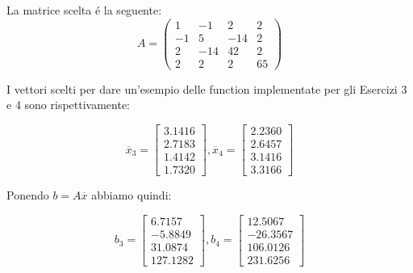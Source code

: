 \begin{center}
\footnotesize\noindent{}\end{center}

\noindent La matrice scelta \'e la seguente:
\[
A = \begin{pmatrix} 1 & -1 & 2 & 2 \\ -1 & 5 & -14 & 2\\ 2 & -14 & 42 & 2\\ 2 & 2 & 2 & 65 \end{pmatrix}
\]

\noindent I vettori scelti per dare un'esempio delle function implementate per gli Esercizi 3 e 4 sono rispettivamente:

\[
\overline{x}_3 = \begin{bmatrix} 3.1416 \\ 2.7183 \\ 1.4142 \\ 1.7320 \end{bmatrix},
\overline{x}_4 = \begin{bmatrix} 2.2360 \\ 2.6457 \\ 3.1416 \\ 3.3166 \end{bmatrix}
\]

\noindent Ponendo \(b=A\overline{x}\) abbiamo quindi:

\[
b_3 = \begin{bmatrix} 6.7157 \\ -5.8849 \\ 31.0874 \\ 127.1282 \end{bmatrix},
b_4 = \begin{bmatrix} 12.5067 \\ -26.3567 \\ 106.0126 \\ 231.6256 \end{bmatrix}
\]

\noindent


